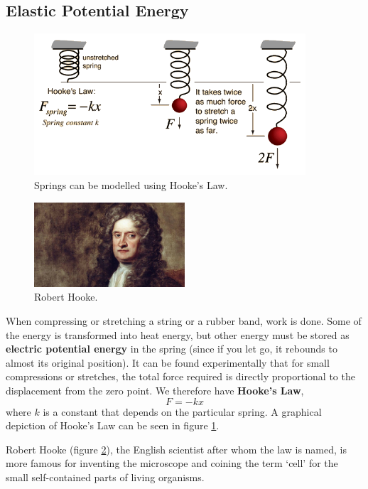 \documentclass[a4paper]{amsbook}
\newcommand\capcite[1]{}
\begin{document}
\subsection{Elastic Potential Energy}
\begin{figure}
  \centering
  \includegraphics[width=0.9\textwidth]{hooke}
  \caption{Springs can be modelled using Hooke's Law. \capcite{http://hyperphysics.phy-astr.gsu.edu/hbase/imgmec/hook.gif}\label{fig:hookeslaw}}
\end{figure}
\begin{figure}
  \centering
  \includegraphics[width=0.5\textwidth]{hookeman}
  \caption{Robert Hooke. \capcite{https://i.vimeocdn.com/video/496483451_1280x720.jpg}\label{fig:hooke}}
\end{figure}
When compressing or stretching a string or a rubber band, work is done. Some of the energy is transformed into
heat energy, but other energy must be stored as \textbf{electric potential energy} in the spring (since if you let go,
it rebounds to almost its original position). It can be found experimentally that for small compressions or stretches,
the total force required is directly proportional to the displacement from the zero point. We therefore have \textbf{Hooke's Law},
\begin{equation}
  F = -kx
\end{equation}
where $ k $ is a constant that depends on the particular spring. A graphical depiction of Hooke's Law can be seen in figure \ref{fig:hookeslaw}.

Robert Hooke (figure \ref{fig:hooke}), the English scientist after whom the law is named, is more famous for inventing the microscope and coining the term `cell'
for the small self-contained parts of living organisms.
\end{document}
